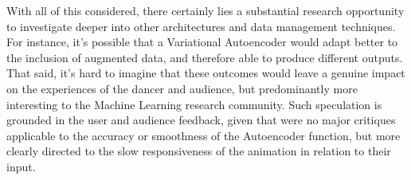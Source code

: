 With all of this considered, there certainly lies a substantial research opportunity to investigate deeper into other architectures and data management techniques. For instance, it's possible that a Variational Autoencoder would adapt better to the inclusion of augmented data, and therefore able to produce different outputs. That said, it's hard to imagine that these outcomes would leave a genuine impact on the experiences of the dancer and audience, but predominantly more interesting to the Machine Learning research community. Such speculation is grounded in the user and audience feedback, given that were no major critiques applicable to the accuracy or smoothness of the Autoencoder function, but more clearly directed to the slow responsiveness of the animation in relation to their input.
